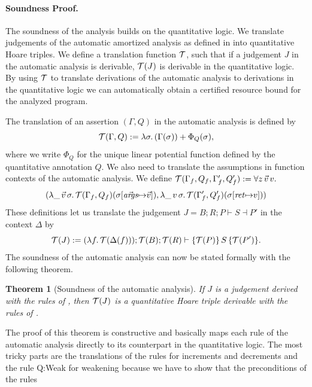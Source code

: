 \documentclass[nocopyrightspace,preprint]{sigplanconf}
\newcommand{\pref}[1]{\prettyref{#1}}
\newtheorem{theorem}{Theorem}
\begin{document}
\paragraph{Soundness Proof.}

The soundness of the analysis builds on the quantitative logic.  We
translate judgements of the automatic amortized analysis as defined in
\pref{fig:auto} into quantitative Hoare triples.  We define a
translation function $\mathcal T$, such that if a judgement $J$ in the
automatic analysis is derivable, $\mathcal T(J)$ is derivable in the
quantitative logic.  By using $\mathcal T$ to translate derivations of the
automatic analysis to derivations in the quantitative logic we can
automatically obtain a certified resource bound for the analyzed
program.

The translation of an assertion $(\Gamma, Q)$ in the automatic
analysis is defined by
$$
  \mathcal T(\Gamma, Q) := \lambda\sigma .\, (\Gamma(\sigma)) + \Phi_Q(\sigma),
$$
where we write $\Phi_Q$ for the unique linear potential function
defined by the quantitative annotation $Q$.  We also need to
translate the assumptions in function contexts of the automatic
analysis.  We define $\mathcal T(\Gamma_f, Q_f, \Gamma'_f, Q'_f) := \forall z \, \vec v \, v . $
%
$$
(
  \lambda \_ \, \vec v \, \sigma .\, \mathcal T(\Gamma_f, Q_f)(\sigma[{\vec {\mathit{args}}} {\mapsto} \vec v]),
  \lambda \_ \, v \, \sigma .\, \mathcal T(\Gamma'_f, Q'_f)(\sigma[{\mathit{ret}} {\mapsto} v])
  )
$$
%
These definitions let us translate the judgement $J = B; R; P \vdash
S \dashv P'$ in the context $\Delta$ by
$$
  \mathcal T(J) :=
  (\lambda f .\, \mathcal T(\Delta(f))); \mathcal T(B); \mathcal T(R) \vdash
    \{\mathcal T(P)\}\, S\, \{\mathcal T(P')\}.
$$
The soundness of the automatic analysis can now be stated
formally with the following theorem.
%
\begin{theorem}[Soundness of the automatic analysis]
  If $J$ is a judgement derived with the rules of
  \pref{fig:auto}, then $\mathcal T(J)$ is a quantitative
  Hoare triple derivable with the rules of
  \pref{fig:logic}.
\end{theorem}
%
\noindent
The proof of this theorem is constructive and basically maps each rule
of the automatic analysis directly to its counterpart in the
quantitative logic.  The most tricky parts are the translations of the
rules for increments and decrements and the rule {\sc Q:Weak} for
weakening because we have to show that the preconditions of the rules
\end{document}
